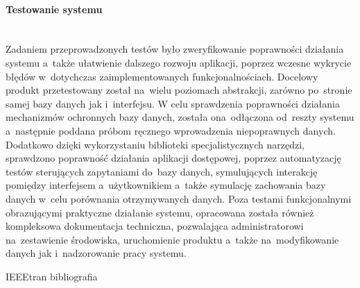 \documentclass[a4paper, 12pt]{article}
\begin{document}
\paragraph{Testowanie systemu} \mbox{}\\
Zadaniem przeprowadzonych testów było zweryfikowanie poprawności działania systemu a~także ułatwienie dalszego rozwoju aplikacji, poprzez wczesne wykrycie błędów w~dotychczas zaimplementowanych funkcjonalnościach. Docelowy produkt przetestowany został na~wielu poziomach abstrakcji, zarówno po~stronie samej bazy danych jak i~interfejsu. W celu sprawdzenia poprawności działania mechanizmów ochronnych bazy danych, została ona~odłączona od~reszty systemu a~następnie poddana próbom ręcznego wprowadzenia niepoprawnych danych. Dodatkowo dzięki wykorzystaniu biblioteki specjalistycznych narzędzi, sprawdzono poprawność działania aplikacji dostępowej, poprzez automatyzację testów sterujących zapytaniami do~bazy danych, symulujących interakcję pomiędzy interfejsem a~użytkownikiem a~także symulację zachowania bazy danych w~celu porównania otrzymywanych danych. Poza testami funkcjonalnymi obrazującymi praktyczne działanie systemu, opracowana została również kompleksowa dokumentacja techniczna, pozwalająca administratorowi na~zestawienie środowiska, uruchomienie produktu a~także na~modyfikowanie danych jak i~nadzorowanie pracy systemu.
\cleardoublepage
{}
 {IEEEtran}
 {bibliografia}
\nocite {*}
\end{document}
